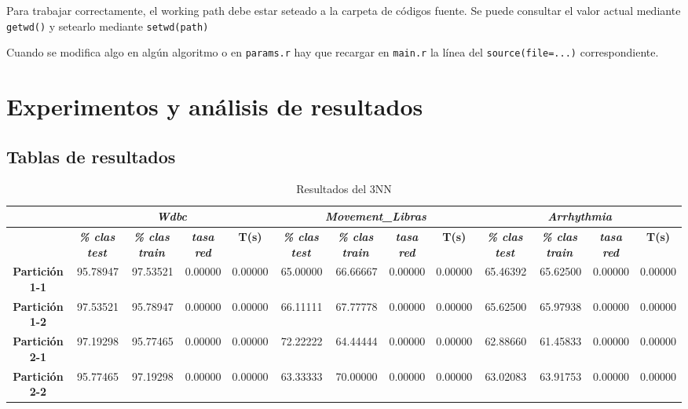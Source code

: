 \documentclass[a4paper,11pt]{article}
\begin{document}
 Para trabajar correctamente, el working path debe estar seteado a la carpeta de códigos fuente. Se puede consultar el 
 valor actual mediante \texttt{getwd()} y setearlo mediante \texttt{setwd(path)}
 
 Cuando se modifica algo en algún algoritmo o en \texttt{params.r} hay que recargar en \texttt{main.r}
 la línea del \texttt{source(file=...)} correspondiente.
 
 \section{Experimentos y análisis de resultados}
 \subsection{Tablas de resultados}
  \begin{table}[H]	
  \caption{Resultados del 3NN}
  \begin{adjustbox}{width=1.1\textwidth}
  \begin{tabular}{|c|r|r|r|r|r|r|r|r|r|r|r|r|}
  \hline
  \multicolumn{1}{|l|}{} & \multicolumn{ 4}{c|}{\textbf{\textit{Wdbc}}} & \multicolumn{ 4}{c|}{\textbf{\textit{Movement\_Libras}}} & \multicolumn{ 4}{c|}{\textbf{\textit{Arrhythmia}}} \\ \hline
  & \multicolumn{1}{c|}{\textbf{\textit{\% clas test}}} & \multicolumn{1}{c|}{\textbf{\textit{\% clas train}}} & \multicolumn{1}{c|}{\textbf{\textit{tasa red}}} & \multicolumn{1}{c|}{\textbf{T(s)}} & \multicolumn{1}{c|}{\textbf{\textit{\% clas test}}} & \multicolumn{1}{c|}{\textbf{\textit{\% clas train}}} & \multicolumn{1}{c|}{\textbf{\textit{tasa red}}} & \multicolumn{1}{c|}{\textbf{T(s)}} & \multicolumn{1}{c|}{\textbf{\textit{\% clas test}}} & \multicolumn{1}{c|}{\textbf{\textit{\% clas train}}} & \multicolumn{1}{c|}{\textbf{\textit{tasa red}}} & \multicolumn{1}{c|}{\textbf{T(s)}} \\ \hline
  \textbf{Partición 1-1} & 95.78947 & 97.53521 & 0.00000 & 0.00000 & 65.00000 & 66.66667 & 0.00000 & 0.00000 & 65.46392 & 65.62500 & 0.00000 & 0.00000 \\ \hline
  \textbf{Partición 1-2} & 97.53521 & 95.78947 & 0.00000 & 0.00000 & 66.11111 & 67.77778 & 0.00000 & 0.00000 & 65.62500 & 65.97938 & 0.00000 & 0.00000 \\ \hline
  \textbf{Partición 2-1} & 97.19298 & 95.77465 & 0.00000 & 0.00000 & 72.22222 & 64.44444 & 0.00000 & 0.00000 & 62.88660 & 61.45833 & 0.00000 & 0.00000 \\ \hline
  \textbf{Partición 2-2} & 95.77465 & 97.19298 & 0.00000 & 0.00000 & 63.33333 & 70.00000 & 0.00000 & 0.00000 & 63.02083 & 63.91753 & 0.00000 & 0.00000 \\ \hline

\end{tabular}
\end{adjustbox}
\end{table}
\end{document}
